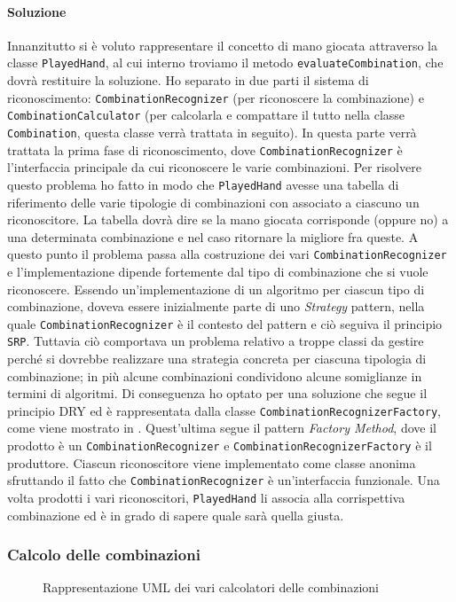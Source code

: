 \documentclass[a4paper,12pt]{report}
\begin{document}
\paragraph{Soluzione}
Innanzitutto si è voluto rappresentare il concetto di mano giocata attraverso la classe \texttt{PlayedHand},
al cui interno troviamo il metodo \texttt{evaluateCombination}, che dovrà restituire la soluzione.
Ho separato in due parti il sistema di riconoscimento: \texttt{CombinationRecognizer} (per riconoscere la combinazione)
e \texttt{CombinationCalculator} (per calcolarla e compattare il tutto nella classe \texttt{Combination}, questa classe verrà
trattata in seguito). In questa parte verrà trattata la prima fase di riconoscimento, dove \texttt{CombinationRecognizer} è
l’interfaccia principale da cui riconoscere le varie combinazioni.
Per risolvere questo problema ho fatto in modo che \texttt{PlayedHand} avesse una tabella di riferimento
delle varie tipologie di combinazioni con associato a ciascuno un riconoscitore. La tabella dovrà dire se la mano giocata
corrisponde (oppure no) a una determinata combinazione e nel caso ritornare la migliore fra queste.
A questo punto il problema passa alla costruzione dei vari \texttt{CombinationRecognizer} e l'implementazione dipende fortemente
dal tipo di combinazione che si vuole riconoscere.
Essendo un'implementazione di un algoritmo per ciascun tipo di combinazione, doveva essere inizialmente parte di uno \textit{Strategy} pattern, nella quale
\texttt{CombinationRecognizer} è il contesto del pattern e ciò seguiva il principio \texttt{SRP}.
Tuttavia ciò comportava un problema relativo a troppe classi da gestire perché si dovrebbe realizzare una strategia concreta
per ciascuna tipologia di combinazione; in più alcune combinazioni condividono alcune somiglianze in
termini di algoritmi. Di conseguenza ho optato per una soluzione che segue il principio DRY ed è
rappresentata dalla classe \texttt{CombinationRecognizerFactory}, come viene mostrato in .
Quest’ultima segue il pattern \textit{Factory Method}, dove il prodotto è un \texttt{CombinationRecognizer} e
\texttt{CombinationRecognizerFactory} è il produttore. Ciascun riconoscitore viene implementato come
classe anonima sfruttando il fatto che \texttt{CombinationRecognizer} è un'interfaccia funzionale.
 Una volta prodotti i vari riconoscitori, \texttt{PlayedHand} li associa alla corrispettiva
 combinazione ed è in grado di sapere quale sarà quella giusta.

 \subsubsection*{Calcolo delle combinazioni}
 \begin{figure}[H]
	 \centering{}
	 
	 \caption{Rappresentazione UML dei vari calcolatori delle combinazioni}
	 \label{img:calculators}
 \end{figure}
\end{document}
